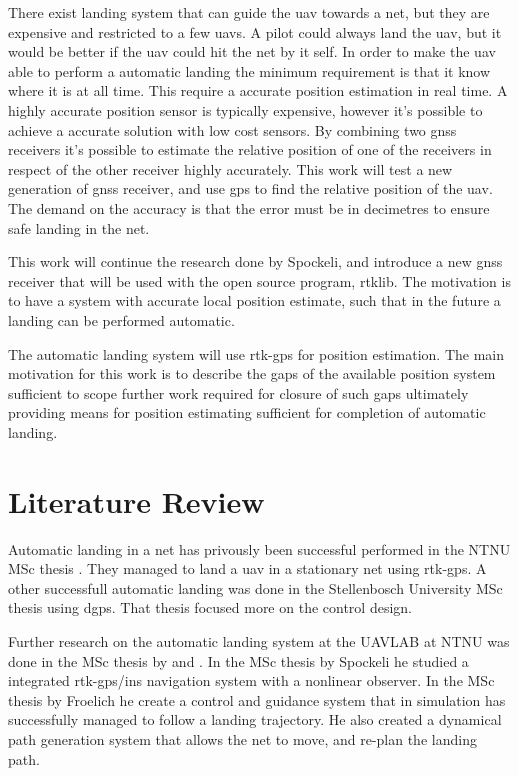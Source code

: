 There exist landing system that can guide the \gls{uav} towards a net, but they are expensive and restricted to a few \glspl{uav}. A pilot could always land the \gls{uav}, but it would be better if the \gls{uav} could hit the net by it self. In order to make the \gls{uav} able to perform a automatic landing the minimum requirement is that it know where it is at all time. This require a accurate position estimation in real time. A highly accurate position sensor is typically expensive, however it's possible to achieve a accurate solution with low cost sensors. By combining two \gls{gnss} receivers it's possible to estimate the relative position of one of the receivers in respect of the other receiver highly accurately. This work will test a new generation of \gls{gnss} receiver, and use \gls{gps} to find the relative position of the \gls{uav}. The demand on the accuracy is that the error must be in decimetres to ensure safe landing in the net.

This work will continue the research done by Spockeli, and introduce a new \gls{gnss} receiver that will be used with the open source program, rtklib. The motivation is to have a system with accurate local position estimate, such that in the future a landing can be performed automatic.

The automatic landing system will use \gls{rtk-gps} for position estimation. The main motivation for this work is to describe the gaps of the available position system sufficient to scope further work required for closure of such gaps ultimately providing means for position estimating sufficient for completion of automatic landing.
\section{Literature Review}
Automatic landing in a net has privously been successful performed in the NTNU MSc thesis \citep{Skulstad&Syversen}. They managed to land a \gls{uav} in a stationary net using \gls{rtk-gps}. A other successfull automatic landing was done in the Stellenbosch University MSc thesis \citep{smit2013autonomous} using \acrfull{dgps}. That thesis focused more on the control design.

Further research on the automatic landing system at the UAVLAB at NTNU was done in the MSc thesis by \citep{Spockeli} and \citep{Froelich}. In the MSc thesis by Spockeli he studied a integrated \gls{rtk-gps}/\gls{ins} navigation system with a nonlinear observer. In the MSc thesis by Froelich he create a control and guidance system that in simulation has successfully managed to follow a landing trajectory. He also created a dynamical path generation system that allows the net to move, and re-plan the landing path.

